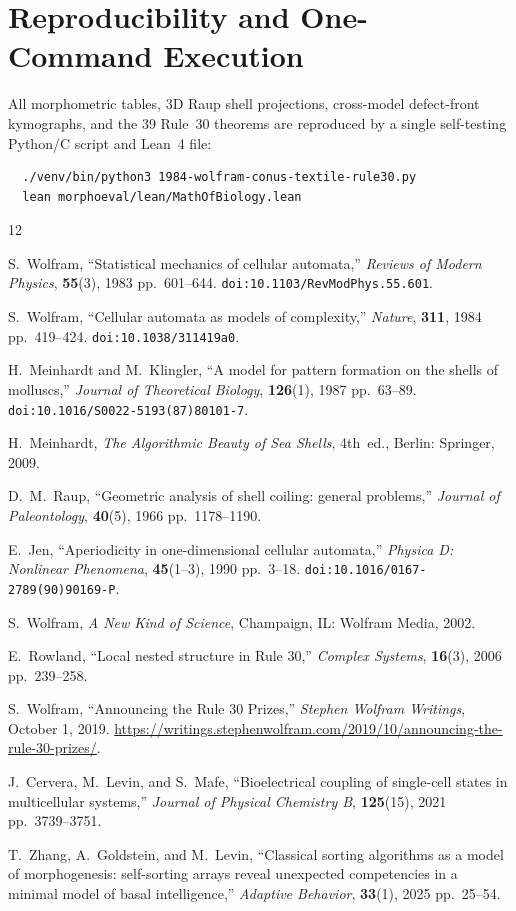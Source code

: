 \documentclass[11pt,a4paper]{article}
\theoremstyle{definition}
\theoremstyle{remark}
\begin{document}
\section{Reproducibility and One-Command Execution}

All morphometric tables, 3D Raup shell projections, cross-model defect-front kymographs, and the 39 Rule~30 theorems are reproduced by a single self-testing Python/C script and Lean~4 file:
\begin{verbatim}
  ./venv/bin/python3 1984-wolfram-conus-textile-rule30.py
  lean morphoeval/lean/MathOfBiology.lean
\end{verbatim}

\begin{thebibliography}{12}

S.~Wolfram, ``Statistical mechanics of cellular automata,'' \emph{Reviews of Modern Physics}, \textbf{55}(3), 1983 pp.~601--644. \texttt{doi:10.1103/RevModPhys.55.601}.

S.~Wolfram, ``Cellular automata as models of complexity,'' \emph{Nature}, \textbf{311}, 1984 pp.~419--424. \texttt{doi:10.1038/311419a0}.

H.~Meinhardt and M.~Klingler, ``A model for pattern formation on the shells of molluscs,'' \emph{Journal of Theoretical Biology}, \textbf{126}(1), 1987 pp.~63--89. \texttt{doi:10.1016/S0022-5193(87)80101-7}.

H.~Meinhardt, \emph{The Algorithmic Beauty of Sea Shells}, 4th~ed., Berlin: Springer, 2009.

D.~M.~Raup, ``Geometric analysis of shell coiling: general problems,'' \emph{Journal of Paleontology}, \textbf{40}(5), 1966 pp.~1178--1190.

E.~Jen, ``Aperiodicity in one-dimensional cellular automata,'' \emph{Physica D: Nonlinear Phenomena}, \textbf{45}(1--3), 1990 pp.~3--18. \texttt{doi:10.1016/0167-2789(90)90169-P}.

S.~Wolfram, \emph{A New Kind of Science}, Champaign, IL: Wolfram Media, 2002.

E.~Rowland, ``Local nested structure in Rule 30,'' \emph{Complex Systems}, \textbf{16}(3), 2006 pp.~239--258.

S.~Wolfram, ``Announcing the Rule 30 Prizes,'' \emph{Stephen Wolfram Writings}, October 1, 2019. \url{https://writings.stephenwolfram.com/2019/10/announcing-the-rule-30-prizes/}.

J.~Cervera, M.~Levin, and S.~Mafe, ``Bioelectrical coupling of single-cell states in multicellular systems,'' \emph{Journal of Physical Chemistry B}, \textbf{125}(15), 2021 pp.~3739--3751.

T.~Zhang, A.~Goldstein, and M.~Levin, ``Classical sorting algorithms as a model of morphogenesis: self-sorting arrays reveal unexpected competencies in a minimal model of basal intelligence,'' \emph{Adaptive Behavior}, \textbf{33}(1), 2025 pp.~25--54.

\end{thebibliography}
\end{document}
